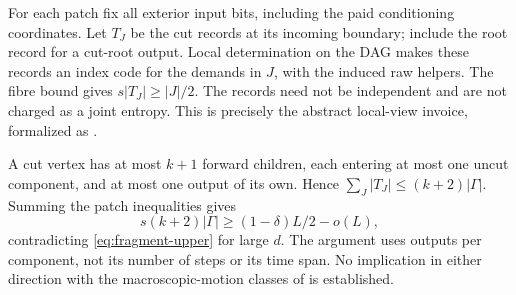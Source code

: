 \begin{informalproof}
For each patch fix all exterior input bits, including the paid conditioning coordinates. Let $T_J$ be the cut
records at its incoming boundary; include the root record for a cut-root output. Local determination on the DAG
makes these records an index code for the demands in $J$, with the induced raw helpers. The fibre bound gives
$s|T_J|\ge |J|/2$. The records need not be independent and are not charged as a joint entropy. This is precisely
the abstract local-view invoice, formalized as .

A cut vertex has at most $k+1$ forward children, each entering at most one uncut component, and at most one output
of its own. Hence $\sum_J|T_J|\le(k+2)|\Gamma|$. Summing the patch inequalities gives
\[
 s(k+2)|\Gamma|\ge(1-\delta)L/2-o(L),
\]
contradicting \eqref{eq:fragment-upper} for large $d$. The argument uses outputs per component, not its number of
steps or its time span. No implication in either direction with the macroscopic-motion classes of
\cite{FourthPaper2026} is established.
\end{informalproof}
